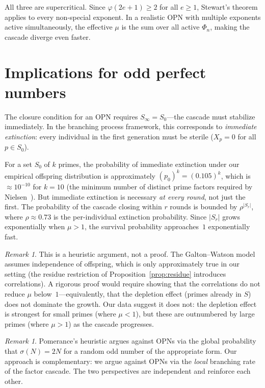 \documentclass[11pt]{article}
\theoremstyle{definition}
\theoremstyle{remark}
\newtheorem{remark}[theorem]{Remark}
\newcommand{\Phi}{\varPhi}
\begin{document}
All three are supercritical. Since $\varphi(2e+1) \geq 2$ for all $e \geq 1$, Stewart's theorem applies to every non-special exponent. In a realistic OPN with multiple exponents active simultaneously, the effective $\mu$ is the sum over all active $\Phi_n$, making the cascade diverge even faster.

\section{Implications for odd perfect numbers}

The closure condition for an OPN requires $S_\infty = S_0$---the cascade must stabilize immediately. In the branching process framework, this corresponds to \emph{immediate extinction}: every individual in the first generation must be sterile ($X_p = 0$ for all $p \in S_0$).

For a set $S_0$ of $k$ primes, the probability of immediate extinction under our empirical offspring distribution is approximately $(p_0)^k = (0.105)^k$, which is $\approx 10^{-10}$ for $k = 10$ (the minimum number of distinct prime factors required by Nielsen~\cite{Nielsen2015}). But immediate extinction is necessary \emph{at every round}, not just the first. The probability of the cascade closing within $r$ rounds is bounded by $\rho^{|S_r|}$, where $\rho \approx 0.73$ is the per-individual extinction probability. Since $|S_r|$ grows exponentially when $\mu > 1$, the survival probability approaches~$1$ exponentially fast.

\begin{remark}
This is a heuristic argument, not a proof. The Galton--Watson model assumes independence of offspring, which is only approximately true in our setting (the residue restriction of Proposition~\ref{prop:residue} introduces correlations). A rigorous proof would require showing that the correlations do not reduce $\mu$ below~$1$---equivalently, that the depletion effect (primes already in $S$) does not dominate the growth. Our data suggest it does not: the depletion effect is strongest for small primes (where $\mu < 1$), but these are outnumbered by large primes (where $\mu > 1$) as the cascade progresses.
\end{remark}

\begin{remark}
Pomerance's heuristic \cite{Pomerance2003} argues against OPNs via the global probability that $\sigma(N) = 2N$ for a random odd number of the appropriate form. Our approach is complementary: we argue against OPNs via the \emph{local} branching rate of the factor cascade. The two perspectives are independent and reinforce each other.
\end{remark}
\end{document}
